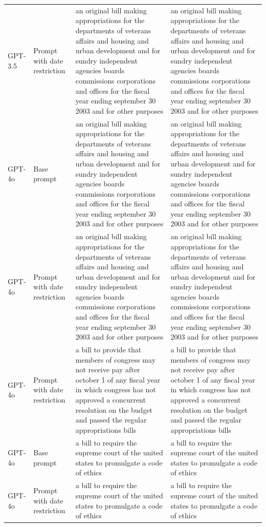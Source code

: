 \begin{longtable}{>{\raggedright\arraybackslash}p{1.4cm}>{\raggedright\arraybackslash}p{1.4cm}>{\raggedright\arraybackslash}p{5.5cm}>{\raggedright\arraybackslash}p{5.5cm}}
GPT-3.5 & Prompt with date restriction & an original bill making appropriations for the departments of veterans affairs and housing and urban development and for sundry independent agencies boards commissions corporations and offices for the fiscal year ending september 30 2003 and for other purposes & an original bill making appropriations for the departments of veterans affairs and housing and urban development and for sundry independent agencies boards commissions corporations and offices for the fiscal year ending september 30 2003 and for other purposes\\
GPT-4o & Base prompt & an original bill making appropriations for the departments of veterans affairs and housing and urban development and for sundry independent agencies boards commissions corporations and offices for the fiscal year ending september 30 2003 and for other purposes & an original bill making appropriations for the departments of veterans affairs and housing and urban development and for sundry independent agencies boards commissions corporations and offices for the fiscal year ending september 30 2003 and for other purposes\\
GPT-4o & Prompt with date restriction & an original bill making appropriations for the departments of veterans affairs and housing and urban development and for sundry independent agencies boards commissions corporations and offices for the fiscal year ending september 30 2003 and for other purposes & an original bill making appropriations for the departments of veterans affairs and housing and urban development and for sundry independent agencies boards commissions corporations and offices for the fiscal year ending september 30 2003 and for other purposes\\
GPT-4o & Prompt with date restriction & a bill to provide that members of congress may not receive pay after october 1 of any fiscal year in which congress has not approved a concurrent resolution on the budget and passed the regular appropriations bills & a bill to provide that members of congress may not receive pay after october 1 of any fiscal year in which congress has not approved a concurrent resolution on the budget and passed the regular appropriations bills\\
GPT-4o & Base prompt & a bill to require the supreme court of the united states to promulgate a code of ethics & a bill to require the supreme court of the united states to promulgate a code of ethics\\
GPT-4o & Prompt with date restriction & a bill to require the supreme court of the united states to promulgate a code of ethics & a bill to require the supreme court of the united states to promulgate a code of ethics\\

\end{longtable}
